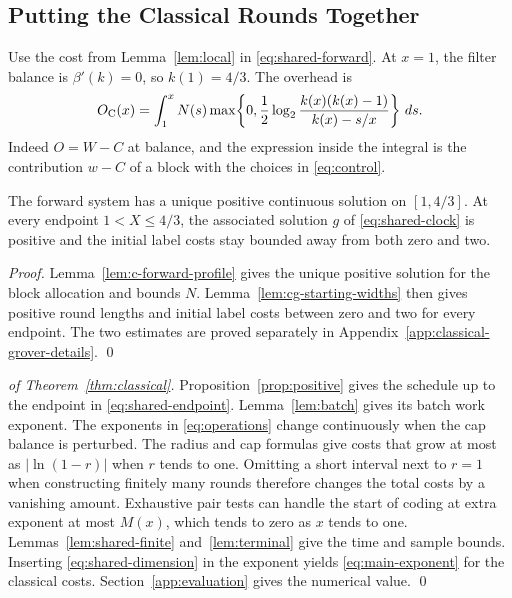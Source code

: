 \documentclass[runningheads,envcountsame,envcountsect,orivec]{llncs}
\begin{document}
\subsection{Putting the Classical Rounds Together}

Use the cost from Lemma~\ref{lem:local} in \eqref{eq:shared-forward}.
At $x=1$, the filter balance is $\beta'(k)=0$, so $k(1)=4/3$.
The overhead is
\begin{align}
 O_{\rm C}(x)=\int_1^x N(s)
 \max\!\left\{0,\frac12\log_2
      \frac{k(x)(k(x)-1)}{k(x)-s/x}\right\}\,ds.
 \label{eq:c-overhead}
\end{align}
Indeed $O=W-C$ at balance, and the expression inside the integral
is the contribution $w-C$ of a block with the choices in
\eqref{eq:control}.

\begin{proposition}
\label{prop:positive}
The forward system has a unique positive continuous solution
on $[1,4/3]$. At every endpoint $1<X\le4/3$, the associated solution $g$
of \eqref{eq:shared-clock} is positive and the initial label costs
stay bounded away from both zero and two.
\end{proposition}

\begin{proof}
Lemma~\ref{lem:c-forward-profile} gives the unique positive
solution for the block allocation and bounds $N$.
Lemma~\ref{lem:cg-starting-widths} then gives positive round
lengths and initial label costs between zero and two for every
endpoint.
The two estimates are proved separately in
Appendix~\ref{app:classical-grover-details}.
\qed
\end{proof}

\begin{proof}[of Theorem~\ref{thm:classical}]
Proposition~\ref{prop:positive} gives the schedule up to the
endpoint in \eqref{eq:shared-endpoint}. Lemma~\ref{lem:batch}
gives its batch work exponent. The exponents in \eqref{eq:operations}
change continuously when the cap balance is perturbed. The
radius and cap formulas give costs that grow at most as
$|\ln(1-r)|$ when $r$ tends to one. Omitting a short interval next
to $r=1$ when constructing finitely many rounds therefore changes
the total costs by a vanishing amount. Exhaustive pair tests can handle the start of
coding at extra exponent at most $M(x)$, which tends to zero as
$x$ tends to one. Lemmas~\ref{lem:shared-finite} and~\ref{lem:terminal}
give the time and sample bounds. Inserting \eqref{eq:shared-dimension}
in the exponent yields \eqref{eq:main-exponent} for the classical costs. Section~\ref{app:evaluation} gives the numerical value.
\qed
\end{proof}
\end{document}
